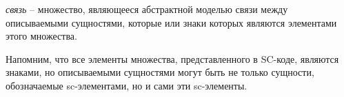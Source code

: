\begin{SCn}
\end{SCn}

\textit{связь} -- множество, являющееся абстрактной моделью связи между описываемыми сущностями, которые или знаки которых являются элементами этого множества.
	
Напомним, что все элементы множества, представленного в SC-коде, являются знаками, но описываемыми сущностями могут быть не только сущности, обозначаемые sc-элементами, но и сами эти sc-элементы.
	
\begin{SCn}
\begin{scnsubdividing}
\end{scnsubdividing}

\begin{scnsubdividing}
\end{scnsubdividing}
	
\begin{scnsubdividing}
\end{scnsubdividing}
\end{SCn}

